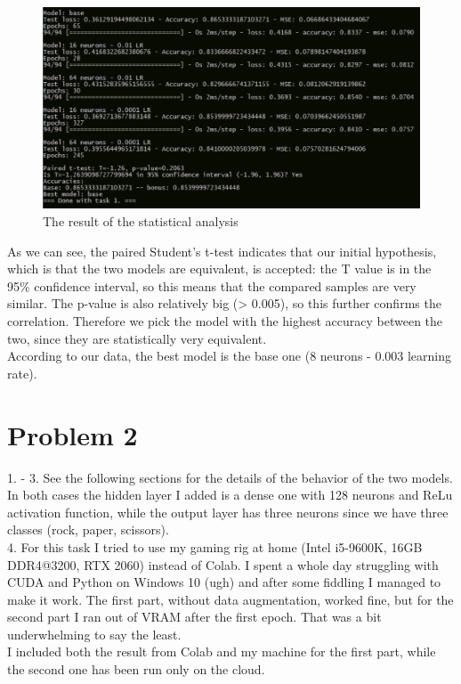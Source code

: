 \documentclass[11pt]{scrartcl}
\begin{document}
	\begin{figure}[H]
		\centering
		\includegraphics[width=\textwidth]{src/result.png}
		\caption{The result of the statistical analysis}
		\label{fig:result}
	\end{figure}

	As we can see, the paired Student's t-test indicates that our initial hypothesis,
	which is that the two models are equivalent, is accepted: the T value is in the
	95\% confidence interval, so this means that the compared samples are very similar. 
	The p-value is also relatively big (> 0.005), so this further confirms the correlation.
	Therefore we pick the model with the highest accuracy between the two, since they
	are statistically very equivalent.\\

	According to our data, the best model is the base one (8 neurons - 0.003 learning rate).


\newpage
\section*{Problem 2}

	1. - 3. See the following sections for the details of the behavior of the two models. In both cases the hidden layer I added is a dense one with 128 neurons and ReLu activation function, while the output layer has three neurons since we have three classes (rock, paper, scissors).\\

	4. For this task I tried to use my gaming rig at home (Intel i5-9600K, 16GB DDR4@3200, RTX 2060) instead of Colab. I spent a whole day struggling with CUDA and Python on Windows 10 (ugh) and after some fiddling I managed to make it work. The first part, without data augmentation, worked fine, but for the second part I ran out of VRAM after the first epoch. That was a bit underwhelming to say the least.\\
	I included both the result from Colab and my machine for the first part, while the second one has been run only on the cloud.\\
\end{document}
